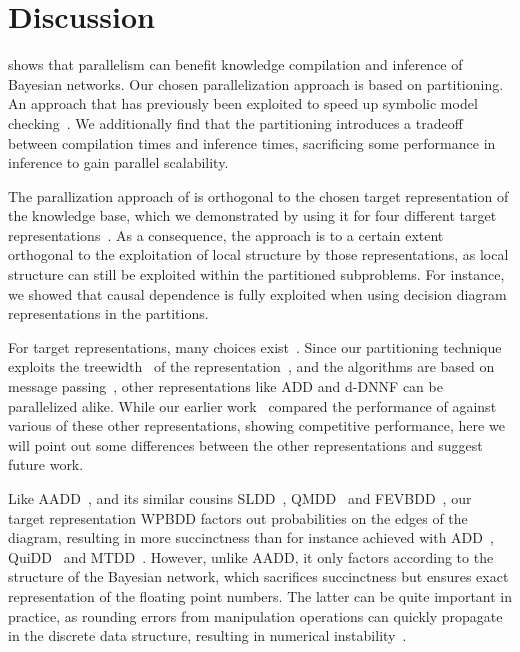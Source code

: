 
\section{Discussion}
\label{sec:conclusion}

\toolname shows that parallelism can benefit knowledge compilation and inference of Bayesian networks. Our chosen parallelization approach is based on partitioning. An approach that has previously been exploited to speed up symbolic model checking~\cite{grumberg2006work,narayan1996partitioned,sahoo2004partitioning}.  We additionally find that the partitioning introduces a tradeoff between compilation times and inference times, sacrificing some performance in inference to gain parallel scalability.




The parallization approach of \toolname is orthogonal to the chosen target representation of the knowledge base, which we demonstrated by using it for four different target representations~\cite{dal2018parallel}. As a consequence, the approach is to a certain extent orthogonal to the exploitation of local structure by those representations, as local structure can still be exploited within the partitioned subproblems. For instance, we showed that causal dependence is fully exploited when using decision diagram representations in the partitions.


For target representations, many choices exist~\cite{darwiche2001decomposable,darwiche2011sdd,darwiche2002knowledge,fargier2014knowledge}. Since our partitioning technique exploits the treewidth~\cite{dechter1998bucket} of the representation~\cite[\S 5]{dal2021compositional}, and the algorithms are based on message passing~\cite[\S 4]{dal2021compositional}, other representations like ADD and d-DNNF can be parallelized alike. While our earlier work~\cite{dal2018parallel} compared the performance of \toolname against various of these other representations, showing competitive performance, here we will point out some differences between the other representations and suggest future work.


Like AADD~\cite{sanner2005affine}, and its similar cousins SLDD~\cite{wilson2005decision}, QMDD~\cite{miller2006qmdd} and FEVBDD~\cite{tafertshofer1997factored}, our target representation WPBDD factors out probabilities on the edges of the diagram, resulting in more succinctness than for instance achieved with ADD~\cite{bahar}, QuiDD~\cite{viamontes2003improving} and MTDD~\cite{Clarke2001}. However, unlike AADD, it only factors according to the structure of the Bayesian network, which sacrifices succinctness but ensures exact representation of the floating point numbers. The latter can be quite important in practice, as rounding errors from manipulation operations can quickly propagate in the discrete data structure, resulting in numerical instability~\cite{zulehner2019efficiently}.

